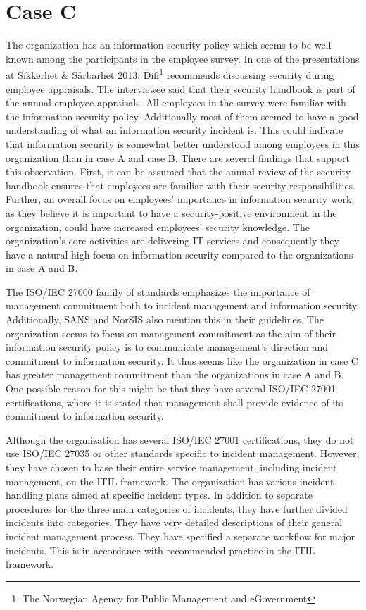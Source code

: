\section{Case C}
The organization has an information security policy which seems to be well known among the participants in the employee survey. In one of the presentations at Sikkerhet \& S\aa rbarhet 2013, Difi\footnote{The Norwegian Agency for Public Management and eGovernment} recommends discussing security during employee appraisals. The interviewee said that their security handbook is part of the annual employee appraisals. All employees in the survey were familiar with the information security policy. Additionally most of them seemed to have a good understanding of what an information security incident is. This could indicate that information security is somewhat better understood among employees in this organization than in case A and case B. There are several findings that support this observation. First, it can be assumed that the annual review of the security handbook ensures that employees are familiar with their security responsibilities. Further, an overall focus on employees' importance in information security work, as they believe it is important to have a security-positive environment in the organization, could have increased employees' security knowledge. The organization's core activities are delivering IT services and consequently they have a natural high focus on information security compared to the organizations in case A and B.

The ISO/IEC 27000 family of standards emphasizes the importance of management commitment both to incident management and information security. Additionally, SANS and NorSIS also mention this in their guidelines. The organization seems to focus on management commitment as the aim of their information security policy is to communicate management's direction and commitment to information security. It thus seems like the organization in case C has greater management commitment than the organizations in case A and B. One possible reason for this might be that they have several ISO/IEC 27001 certifications, where it is stated that management shall provide evidence of its commitment to information security.

Although the organization has several ISO/IEC 27001 certifications, they do not use ISO/IEC 27035 or other standards specific to incident management. However, they have chosen to base their entire service management, including incident management, on the ITIL framework. The organization has various incident handling plans aimed at specific incident types. In addition to separate procedures for the three main categories of incidents, they have further divided incidents into categories. They have very detailed descriptions of their general incident management process. They have specified a separate workflow for major incidents. This is in accordance with recommended practice in the ITIL framework. 
 
